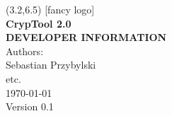 \begin{titlepage}
\vspace*{-1cm}
\newlength{\links}
\setlength{\links}{0.9cm}
\setlength{\TPHorizModule}{1cm}
\setlength{\TPVertModule}{1cm}
\textblockorigin{0pt}{0pt}

\sf
\LARGE

\begin{textblock}{14.5}(3.2,6.5)
\Large [fancy logo] \\[3cm]  
{ \bf CrypTool 2.0} \\[1cm]
{\LARGE \bf DEVELOPER INFORMATION}\\[1.3cm]

\normalsize Authors:\\
\Large Sebastian Przybylski\\
etc.\\

\large \today\\
Version 0.1
\end{textblock}

\end{titlepage}
